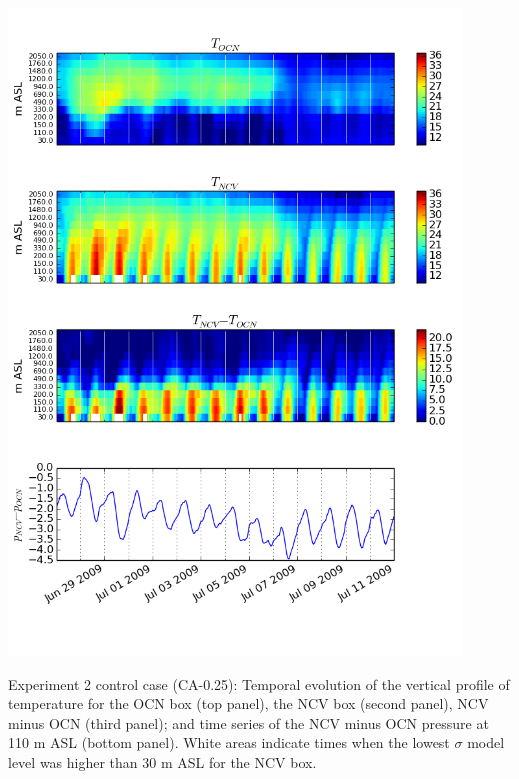 \begin{FPfigure}
\includegraphics[width=0.9\textwidth]{ch3-wind/img/timeheight_T_pdiff_OCN_NCV_0pt25.png}
\caption{Experiment 2 control case (CA-0.25): Temporal evolution of the vertical profile of temperature for the OCN box (top panel), the NCV box (second panel), NCV minus OCN (third panel); and time series of the NCV minus OCN pressure at 110 m ASL (bottom panel).  White areas indicate times when the lowest $\sigma$ model level was higher than 30 m ASL for the NCV box.}
\label{fig:windSol_TimeHeightCtrl}
\end{FPfigure}

